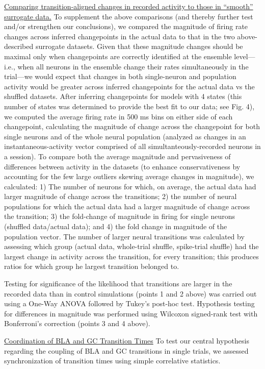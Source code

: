 \begin{refsection}
\noindent\underline{Comparing transition-aligned changes in recorded activity to those in “smooth” surrogate data.} To supplement the above comparisons (and thereby further test and/or strengthen our conclusions), we compared the magnitude of firing rate changes across inferred changepoints in the actual data to that in the two above-described surrogate datasets. Given that these magnitude changes should be maximal only when changepoints are correctly identified at the ensemble level—i.e., when all neurons in the ensemble change their rates simultaneously in the trial—we would expect that changes in both single-neuron and population activity would be greater across inferred changepoints for the actual data vs the shuffled datasets. After inferring changepoints for models with 4 states (this number of states was determined to provide the best fit to our data; see Fig. 4), we computed the average firing rate in 500 ms bins on either side of each changepoint, calculating the magnitude of change across the changepoint for both single neurons and of the whole neural population (analyzed as changes in an instantaneous-activity vector comprised of all simultanteously-recorded neurons in a session). To compare both the average magnitude and pervasiveness of differences between activity in the datasets (to enhance conservativeness by accounting for the few large outliers skewing average changes in magnitude), we calculated: 1) The number of neurons for which, on average, the actual data had larger magnitude of change across the transitions; 2) the number of neural populations for which the actual data had a larger magnitude of change across the transition; 3) the fold-change of magnitude in firing for single neurons (shuffled data/actual data); and 4) the fold change in magnitude of the population vector. The number of larger neural transitions was calculated by assessing which group (actual data, whole-trial shuffle, spike-trial shuffle) had the largest change in activity across the transition, for every transition; this produces ratios for which group he largest transition belonged to.

\noindent Testing for significance of the likelihood that transitions  are larger in the recorded data than in control simulations (points 1 and 2 above) was carried out using a One-Way ANOVA followed by Tukey’s post-hoc test. Hypothesis testing for differences in magnitude was performed using Wilcoxon signed-rank test with Bonferroni’s correction (points 3 and 4 above). 

\noindent\underline{Coordination of BLA and GC Transition Times}
To test our central hypothesis regarding the coupling of BLA and GC transitions in single trials, we assessed synchronization of transition times using simple correlative statistics.


\end{refsection}
